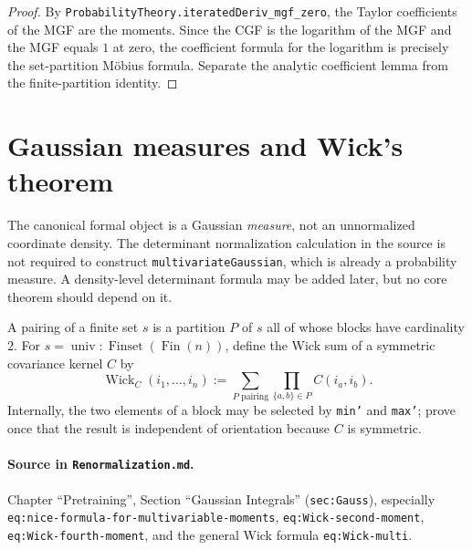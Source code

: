 \begin{proof}
By \texttt{ProbabilityTheory.iteratedDeriv\_mgf\_zero}, the Taylor coefficients of the MGF are
the moments.  Since the CGF is the logarithm of the MGF and the MGF equals $1$ at zero, the
coefficient formula for the logarithm is precisely the set-partition M\"obius formula.  Separate
the analytic coefficient lemma from the finite-partition identity.
\end{proof}

\section{Gaussian measures and Wick's theorem}

The canonical formal object is a Gaussian \emph{measure}, not an unnormalized coordinate density.
The determinant normalization calculation in the source is not required to construct
\texttt{multivariateGaussian}, which is already a probability measure.  A density-level determinant
formula may be added later, but no core theorem should depend on it.

\begin{definition}
\label{def:renorm:pairing}
A pairing of a finite set $s$ is a partition $P$ of $s$ all of whose blocks have cardinality $2$.
For $s=\operatorname{univ}:\operatorname{Finset}(\operatorname{Fin}(n))$, define the Wick sum of a
symmetric covariance kernel $C$ by
\[
  \operatorname{Wick}_C(i_1,\ldots,i_n)
  :=\sum_{P\text{ pairing}}\prod_{\{a,b\}\in P}C(i_a,i_b).
\]
Internally, the two elements of a block may be selected by \texttt{min'} and \texttt{max'}; prove
once that the result is independent of orientation because $C$ is symmetric.

\paragraph{Source in \texttt{Renormalization.md}.}
Chapter ``Pretraining'', Section ``Gaussian Integrals'' (\texttt{sec:Gauss}), especially
\texttt{eq:nice-formula-for-multivariable-moments}, \texttt{eq:Wick-second-moment},
\texttt{eq:Wick-fourth-moment}, and the general Wick formula \texttt{eq:Wick-multi}.
\end{definition}

